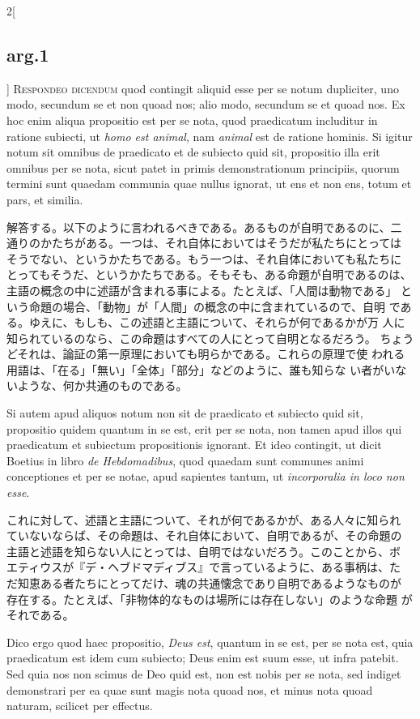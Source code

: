 \documentclass[paper=a4paper,fontsize=10pt,jafontsize=9pt,titlepage]{jlreq}
\begin{document}
\begin{paracol}{2}[\subsection{arg.1}]
{\scshape Respondeo dicendum} quod contingit aliquid esse per se notum
dupliciter, uno modo, secundum se et non quoad nos; alio modo,
secundum se et quoad nos. Ex hoc enim aliqua propositio est per se
nota, quod praedicatum includitur in ratione subiecti, ut {\itshape homo
est animal}, nam {\itshape animal} est de ratione hominis. Si igitur notum
sit omnibus de praedicato et de subiecto quid sit, propositio illa
erit omnibus per se nota, sicut patet in primis demonstrationum
principiis, quorum termini sunt quaedam communia quae nullus ignorat,
ut ens et non ens, totum et pars, et similia.

\switchcolumn

解答する。以下のように言われるべきである。あるものが自明であるのに、二
通りのかたちがある。一つは、それ自体においてはそうだが私たちにとっては
そうでない、というかたちである。もう一つは、それ自体においても私たちに
とってもそうだ、というかたちである。そもそも、ある命題が自明であるのは、
主語の概念の中に述語が含まれる事による。たとえば、「人間は動物である」
という命題の場合、「動物」が「人間」の概念の中に含まれているので、自明
である。ゆえに、もしも、この述語と主語について、それらが何であるかが万
人に知られているのなら、この命題はすべての人にとって自明となるだろう。
ちょうどそれは、論証の第一原理においても明らかである。これらの原理で使
われる用語は、「在る」「無い」「全体」「部分」などのように、誰も知らな
い者がいないような、何か共通のものである。

\switchcolumn*

Si autem apud aliquos notum non sit de praedicato et subiecto quid
sit, propositio quidem quantum in se est, erit per se nota, non tamen
apud illos qui praedicatum et subiectum propositionis ignorant. Et
ideo contingit, ut dicit Boetius in libro {\itshape de Hebdomadibus}, quod
quaedam sunt communes animi conceptiones et per se notae, apud
sapientes tantum, ut {\itshape incorporalia in loco non esse}.

\switchcolumn

これに対して、述語と主語について、それが何であるかが、ある人々に知られ
ていないならば、その命題は、それ自体において、自明であるが、その命題の
主語と述語を知らない人にとっては、自明ではないだろう。このことから、ボ
エティウスが『デ・ヘブドマディブス』で言っているように、ある事柄は、た
だ知恵ある者たちにとってだけ、魂の共通懐念であり自明であるようなものが
存在する。たとえば、「非物体的なものは場所には存在しない」のような命題
がそれである。

\switchcolumn*

Dico ergo quod haec propositio, {\itshape Deus est}, quantum in se est, per
se nota est, quia praedicatum est idem cum subiecto; Deus enim est
suum esse, ut infra patebit. Sed quia nos non scimus de Deo quid est,
non est nobis per se nota, sed indiget demonstrari per ea quae sunt
magis nota quoad nos, et minus nota quoad naturam, scilicet per
effectus.


\end{paracol}
\end{document}
